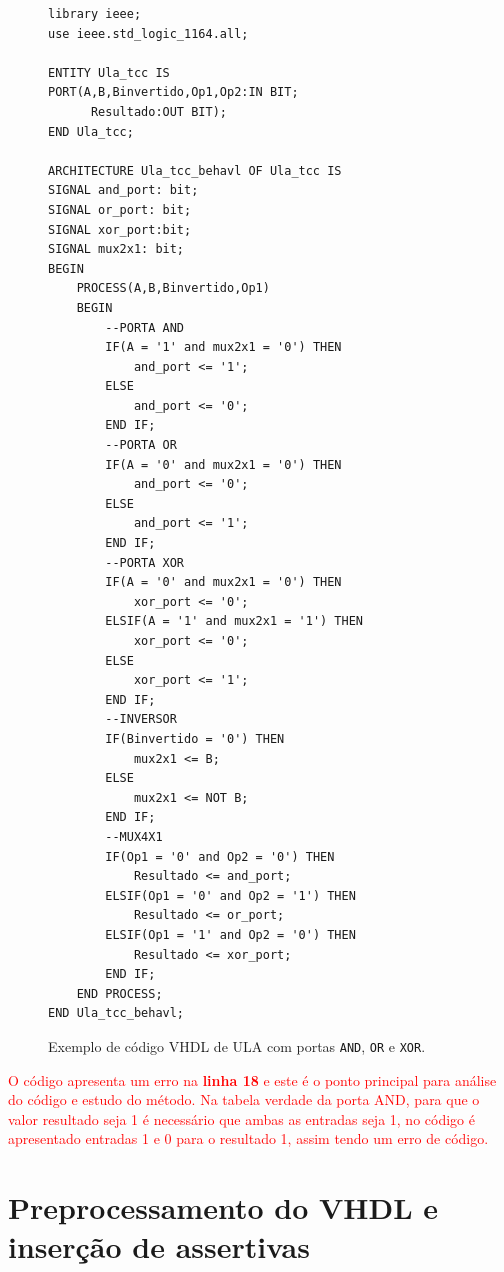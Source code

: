 \begin{figure}[H]
\caption{\label{fig:code_exemplo} Exemplo de código VHDL de ULA com portas \texttt{AND}, \texttt{OR} e \texttt{XOR}.}
	\begin{center}
    \begin{minipage}{0.5\textwidth}
    \begin{lstlisting}       
library ieee;
use ieee.std_logic_1164.all;

ENTITY Ula_tcc IS
PORT(A,B,Binvertido,Op1,Op2:IN BIT;
	  Resultado:OUT BIT);
END Ula_tcc;

ARCHITECTURE Ula_tcc_behavl OF Ula_tcc IS
SIGNAL and_port: bit;
SIGNAL or_port: bit;
SIGNAL xor_port:bit;
SIGNAL mux2x1: bit;
BEGIN
	PROCESS(A,B,Binvertido,Op1)
	BEGIN
		--PORTA AND
		IF(A = '1' and mux2x1 = '0') THEN
		    and_port <= '1';
		ELSE
		    and_port <= '0';
		END IF;
		--PORTA OR
		IF(A = '0' and mux2x1 = '0') THEN
		    and_port <= '0';
		ELSE
		    and_port <= '1';
		END IF;
		--PORTA XOR
		IF(A = '0' and mux2x1 = '0') THEN
		    xor_port <= '0';
		ELSIF(A = '1' and mux2x1 = '1') THEN
		    xor_port <= '0';
		ELSE
		    xor_port <= '1';
		END IF;
		--INVERSOR
		IF(Binvertido = '0') THEN
			mux2x1 <= B;
		ELSE
			mux2x1 <= NOT B;
		END IF;
		--MUX4X1
		IF(Op1 = '0' and Op2 = '0') THEN
			Resultado <= and_port;
		ELSIF(Op1 = '0' and Op2 = '1') THEN
			Resultado <= or_port;
		ELSIF(Op1 = '1' and Op2 = '0') THEN
			Resultado <= xor_port;
		END IF;
	END PROCESS;
END Ula_tcc_behavl;
    \end{lstlisting}
    \end{minipage}
	\end{center}
\end{figure}

\textcolor{red}{O código apresenta um erro na \textbf{linha 18} e este é o ponto principal para análise do código e estudo do método. Na tabela verdade da porta AND, para que o valor resultado seja 1 é necessário que ambas as entradas seja 1, no código é apresentado entradas 1 e 0 para o resultado 1, assim tendo um erro de código.}
\section{Preprocessamento do VHDL e inserção de assertivas}
\label{cap:vhdl_assertivas}

